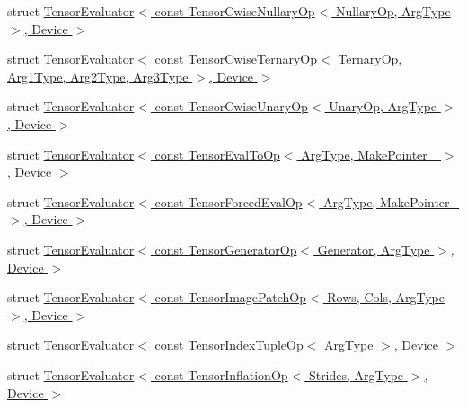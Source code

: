 \begin{DoxyCompactItemize}
\item 
struct \hyperlink{struct_eigen_1_1_tensor_evaluator_3_01const_01_tensor_cwise_nullary_op_3_01_nullary_op_00_01_arg_type_01_4_00_01_device_01_4}{Tensor\+Evaluator$<$ const Tensor\+Cwise\+Nullary\+Op$<$ Nullary\+Op, Arg\+Type $>$, Device $>$}
\item 
struct \hyperlink{struct_eigen_1_1_tensor_evaluator_3_01const_01_tensor_cwise_ternary_op_3_01_ternary_op_00_01_arg9fef65261bbea39b0e5e8b56a6f07cfb}{Tensor\+Evaluator$<$ const Tensor\+Cwise\+Ternary\+Op$<$ Ternary\+Op, Arg1\+Type, Arg2\+Type, Arg3\+Type $>$, Device $>$}
\item 
struct \hyperlink{struct_eigen_1_1_tensor_evaluator_3_01const_01_tensor_cwise_unary_op_3_01_unary_op_00_01_arg_type_01_4_00_01_device_01_4}{Tensor\+Evaluator$<$ const Tensor\+Cwise\+Unary\+Op$<$ Unary\+Op, Arg\+Type $>$, Device $>$}
\item 
struct \hyperlink{struct_eigen_1_1_tensor_evaluator_3_01const_01_tensor_eval_to_op_3_01_arg_type_00_01_make_pointer___01_4_00_01_device_01_4}{Tensor\+Evaluator$<$ const Tensor\+Eval\+To\+Op$<$ Arg\+Type, Make\+Pointer\+\_\+ $>$, Device $>$}
\item 
struct \hyperlink{struct_eigen_1_1_tensor_evaluator_3_01const_01_tensor_forced_eval_op_3_01_arg_type_00_01_make_pointer___01_4_00_01_device_01_4}{Tensor\+Evaluator$<$ const Tensor\+Forced\+Eval\+Op$<$ Arg\+Type, Make\+Pointer\+\_\+ $>$, Device $>$}
\item 
struct \hyperlink{struct_eigen_1_1_tensor_evaluator_3_01const_01_tensor_generator_op_3_01_generator_00_01_arg_type_01_4_00_01_device_01_4}{Tensor\+Evaluator$<$ const Tensor\+Generator\+Op$<$ Generator, Arg\+Type $>$, Device $>$}
\item 
struct \hyperlink{struct_eigen_1_1_tensor_evaluator_3_01const_01_tensor_image_patch_op_3_01_rows_00_01_cols_00_01_arg_type_01_4_00_01_device_01_4}{Tensor\+Evaluator$<$ const Tensor\+Image\+Patch\+Op$<$ Rows, Cols, Arg\+Type $>$, Device $>$}
\item 
struct \hyperlink{struct_eigen_1_1_tensor_evaluator_3_01const_01_tensor_index_tuple_op_3_01_arg_type_01_4_00_01_device_01_4}{Tensor\+Evaluator$<$ const Tensor\+Index\+Tuple\+Op$<$ Arg\+Type $>$, Device $>$}
\item 
struct \hyperlink{struct_eigen_1_1_tensor_evaluator_3_01const_01_tensor_inflation_op_3_01_strides_00_01_arg_type_01_4_00_01_device_01_4}{Tensor\+Evaluator$<$ const Tensor\+Inflation\+Op$<$ Strides, Arg\+Type $>$, Device $>$}
\item 

\end{DoxyCompactItemize}
